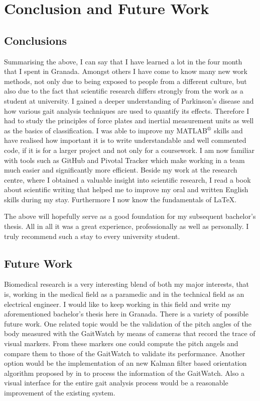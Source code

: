 \chapter{Conclusion and Future Work}
\label{ch:Conclusion and Future Work}

\section{Conclusions}

Summarising the above, I can say that I have learned a lot in the four month that I spent in Granada. Amongst others I have come to know many new work methods, not only due to being exposed to people from a different culture, but also due to the fact that scientific research differs strongly from the work as a student at university. I gained a deeper understanding of Parkinson's disease and how various gait analysis techniques are used to quantify its effects. Therefore I had to study the principles of force plates and inertial measurement units as well as the basics of classification. I was able to improve my MATLAB$\textsuperscript{\textregistered}$ skills and have realised how important it is to write understandable and well commented code, if it is for a larger project and not only for a coursework. I am now familiar with tools such as GitHub and Pivotal Tracker which make working in a team much easier and significantly more efficient.  Beside my work at the research centre, where I obtained a valuable insight into scientific research, I read a book about scientific writing that helped me to improve my oral and written English skills during my stay. Furthermore I now know the fundamentals of \LaTeX{}.

The above will hopefully serve as a good foundation for my subsequent bachelor's thesis.  All in all it was a great experience, professionally as well as personally. I truly recommend such a stay to every university student.

\section{Future Work}

Biomedical research is a very interesting blend of both my major interests, that is, working in the medical field as a paramedic and  in the technical field as an electrical engineer. I would like to keep working in this field and write my aforementioned bachelor's thesis here in Granada. There is a variety of possible future work. One related topic would be the validation of the pitch angles of the body measured with the GaitWatch by means of cameras that record the trace of visual markers. From these markers one could compute the pitch angels and compare them to those of the GaitWatch to validate its performance. Another option would be the implementation of an new Kalman filter based orientation algorithm proposed by \citeauthor{bennett_motion_2014} in \cite{bennett_motion_2014} to process the information of the GaitWatch. Also a visual interface for the entire gait analysis process would be a reasonable improvement of the existing system.